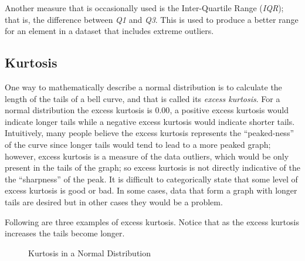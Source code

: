 Another measure that is occasionally used is the Inter-Quartile Range (\textit{IQR}); that is, the difference between \textit{Q1} and \textit{Q3}. This is used to produce a better range for an element in a dataset that includes extreme outliers.

\subsection{Kurtosis}\label{lab03_kurt}

One way to mathematically describe a normal distribution is to calculate the length of the tails of a bell curve, and that is called its \textit{excess kurtosis}. For a normal distribution the excess kurtosis is $ 0.00 $, a positive excess kurtosis would indicate longer tails while a negative excess kurtosis would indicate shorter tails. Intuitively, many people believe the excess kurtosis represents the ``peaked-ness'' of the curve since longer tails would tend to lead to a more peaked graph; however, excess kurtosis is a measure of the data outliers, which would be only present in the tails of the graph; so excess kurtosis is not directly indicative of the the ``sharpness'' of the peak. It is difficult to categorically state that some level of excess kurtosis is good or bad. In some cases, data that form a graph with longer tails are desired but in other cases they would be a problem.

Following are three examples of excess kurtosis. Notice that as the excess kurtosis increases the tails become longer. 

\begin{figure}[H]
  \begin{center}
  \end{center}
  \caption{Kurtosis in a Normal Distribution}
  \label{lab03_fig02}  
\end{figure}

